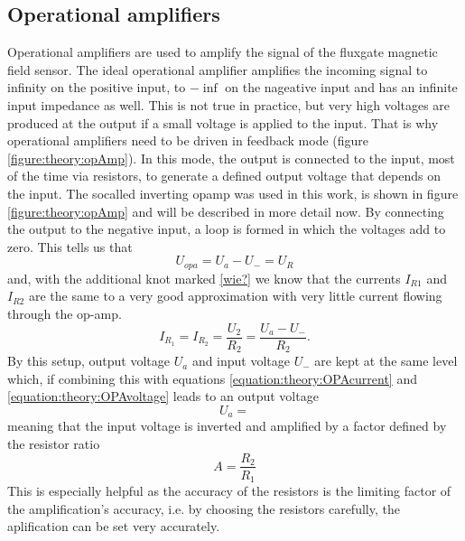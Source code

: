             \subsection{Operational amplifiers}
                Operational amplifiers are used to amplify the signal of the fluxgate magnetic field sensor. The ideal operational amplifier amplifies the incoming signal to infinity on the positive input, to $-\inf$ on the nageative input and has an infinite input impedance as well. This is not true in practice, but very high voltages are produced at the output if a small voltage is applied to the input. That is why operational amplifiers need to be driven in feedback mode (figure \ref{figure:theory:opAmp}). In this mode, the output is connected to the input, most of the time via resistors, to generate a defined output voltage that depends on the input. The socalled inverting opamp was used in this work, is shown in figure \ref{figure:theory:opAmp} and will be described in more detail now.
                By connecting the output to the negative input, a loop is formed in which the voltages add to zero. This tells us that
                \begin{equation*}
                    \label{equation:theory:OPAvoltage}
                    U_{opa} = U_a - U_- = U_R
                \end{equation*}
                and, with the additional knot marked \ref{wie?} we know that the currents $I_{R1}$ and $I_{R2}$ are the same to a very good approximation with very little current flowing through the op-amp. 
                \begin{equation}
                    \label{equation:theory:OPAcurrent}
                    I_{R_1} = I_{R_2} = \frac{U_2}{R_2}= \frac{U_a - U_-}{R_2}.
                \end{equation}
                By this setup, output voltage $U_a$ and input voltage $U_-$ are kept at the same level which, if combining this with equations \ref{equation:theory:OPAcurrent} and \ref{equation:theory:OPAvoltage} leads to an output voltage 
                \begin{equation}
                    U_a = 
                \end{equation}
                meaning that the input voltage is inverted and amplified by a factor defined by the resistor ratio
                \begin{equation}
                    A=\frac{R_2}{R_1}
                \end{equation}
                This is especially helpful as the accuracy of the resistors is the limiting factor of the amplification's accuracy, i.e. by choosing the resistors carefully, the aplification can be set very accurately.


